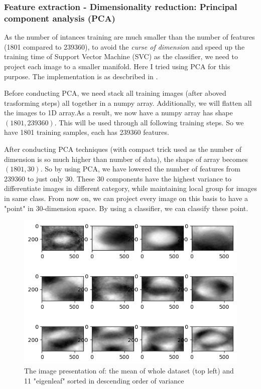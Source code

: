 \documentclass[12pt, a4paper]{article}
\begin{document}
	\subsubsection{Feature extraction - Dimensionality reduction: Principal component analysis (PCA)}	
	
	As the number of intances training are much smaller than the number of features (1801 compared to 239360), to avoid the \emph{curse of dimension} and speed up the training time of Support Vector Machine (SVC) as the classifier, we need to project each image to a smaller manifold. Here I tried using PCA for this purpose. The implementation is as descbribed in \cite{Solem2012}.
	
	Before conducting PCA, we need stack all training images (after aboved trasforming steps) all together in a numpy array. Additionally, we will flatten all the images to 1D array.As a result, we now have a numpy array has shape $(1801, 239360)$. This will be used through all following training steps. So we have 1801 training samples, each has 239360 features.
	
	After conducting PCA techniques (with compact trick used as the number of dimension is so much higher than number of data), the shape of array becomes $(1801, 30)$. So by using PCA, we have lowered the number of features from 239360 to just only 30. These 30 components have the highest variance to differentiate images in different category, while maintaining local group for images in same class. From now on, we can project every image on this basis to have a "point" in 30-dimension space. By using a classifier, we can classify these point.
	
	\begin{figure}[!ht]
	\centering
	\includegraphics[scale=1]{pic_2.png}
	\caption{The image presentation of: the mean of whole dataset (top left) and 11 "eigenleaf" sorted in descending order of variance}
	\end{figure}
	
\end{document}
